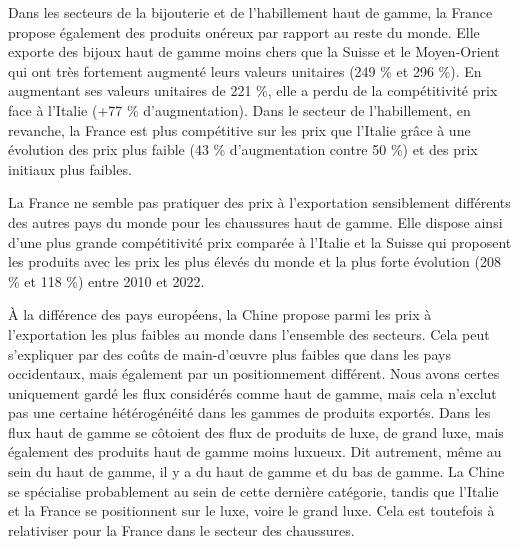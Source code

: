 \documentclass[french,10pt,a4paper]{article}
\begin{document}
Dans les secteurs de la bijouterie et de l'habillement haut de gamme, la France propose également des produits onéreux par rapport au reste du monde. Elle exporte des bijoux haut de gamme moins chers que la Suisse et le Moyen-Orient qui ont très fortement augmenté leurs valeurs unitaires (249 \% et 296 \%). En augmentant ses valeurs unitaires de 221 \%, elle a perdu de la compétitivité prix face à l'Italie (+77 \% d'augmentation). Dans le secteur de l'habillement, en revanche, la France est plus compétitive sur les prix que l'Italie grâce à une évolution des prix plus faible (43 \% d'augmentation contre 50 \%) et des prix initiaux plus faibles. 

La France ne semble pas pratiquer des prix à l'exportation sensiblement différents des autres pays du monde pour les chaussures haut de gamme. Elle dispose ainsi d'une plus grande compétitivité prix comparée à l'Italie et la Suisse qui proposent les produits avec les prix les plus élevés du monde et la plus forte évolution (208 \% et 118 \%) entre 2010 et 2022. 

À la différence des pays européens, la Chine propose parmi les prix à l'exportation les plus faibles au monde dans l'ensemble des secteurs. Cela peut s'expliquer par des coûts de main-d'œuvre plus faibles que dans les pays occidentaux, mais également par un positionnement différent. Nous avons certes uniquement gardé les flux considérés comme haut de gamme, mais cela n'exclut pas une certaine hétérogénéité dans les gammes de produits exportés. Dans les flux haut de gamme se côtoient des flux de produits de luxe, de grand luxe, mais également des produits haut de gamme moins luxueux. Dit autrement, même au sein du haut de gamme, il y a du haut de gamme et du bas de gamme. La Chine se spécialise probablement au sein de cette dernière catégorie, tandis que l'Italie et la France se positionnent sur le luxe, voire le grand luxe. Cela est toutefois à relativiser pour la France dans le secteur des chaussures.

\bigskip
\end{document}
